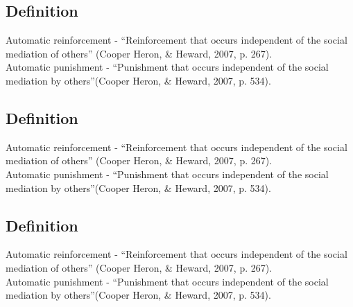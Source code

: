 \subsection{Definition}
Automatic reinforcement - ``Reinforcement that occurs independent of the social mediation of others'' (Cooper Heron, \& Heward, 2007, p. 267).\\

Automatic punishment - ``Punishment that occurs independent of the social mediation by others''(Cooper Heron, \& Heward, 2007, p. 534).
%
\subsection{Definition}
Automatic reinforcement - ``Reinforcement that occurs independent of the social mediation of others'' (Cooper Heron, \& Heward, 2007, p. 267).\\

Automatic punishment - ``Punishment that occurs independent of the social mediation by others''(Cooper Heron, \& Heward, 2007, p. 534).
%
\subsection{Definition}
Automatic reinforcement - ``Reinforcement that occurs independent of the social mediation of others'' (Cooper Heron, \& Heward, 2007, p. 267).\\

Automatic punishment - ``Punishment that occurs independent of the social mediation by others''(Cooper Heron, \& Heward, 2007, p. 534).
%
